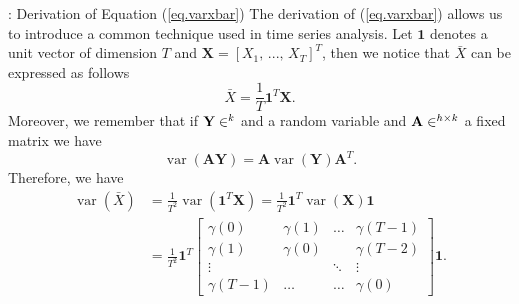 \documentclass[envcountsect,usenames,dvipsnames]{beamer}
\DeclareMathOperator*{\var}{var}
\theoremstyle{mystyle}
\begin{document}
\begin{frame}{\thesubsection: Derivation of Equation (\ref{eq.varxbar})}
\small
    The derivation of (\ref{eq.varxbar}) allows us to introduce a common technique used in time series analysis. Let $\mathbf{1}$ denotes a unit vector of dimension $T$ and $\mathbf{X} = [X_1, \,...,\, X_T]^T$, then we notice that $\bar{X}$ can be expressed as follows
    \begin{equation*}
        \bar{X} = \frac{1}{T} \mathbf{1}^T \mathbf{X}.
    \end{equation*}
    Moreover, we remember that if $\mathbf{Y} \in \real^k$ and a random variable and $\mathbf{A} \in \real^{h \times k}$ a fixed matrix we have
    \begin{equation*}
        \var\left(\mathbf{A} \mathbf{Y}\right) = \mathbf{A} \var\left( \mathbf{Y}\right) \mathbf{A}^T.
    \end{equation*}
    Therefore, we have
    \begin{equation*}
        \begin{aligned}
            \var \left( {\bar X} \right) &= \frac{1}{T^2}  \var \left( \mathbf{1}^T \mathbf{X} \right) =  \frac{1}{T^2} \mathbf{1}^T \var \left( \mathbf{X} \right) \mathbf{1}\\
            &= \frac{1}{T^2} \mathbf{1}^T \begin{bmatrix}
	 \gamma(0) & \gamma(1) & \ldots & \gamma(T-1)\\
	 \gamma(1) & \gamma(0) &  & \gamma(T-2) \\
	 \vdots &  & \ddots & \vdots \\
	 \gamma(T-1) & \ldots & \ldots & \gamma(0)
	 \end{bmatrix} \mathbf{1} .
        \end{aligned}
    \end{equation*}
    
\end{frame}
\end{document}
